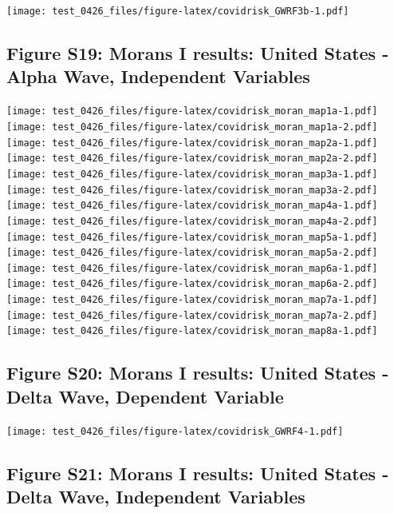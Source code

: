 \documentclass[
]{article}
\begin{document}
\texttt{[image: test\_0426\_files/figure-latex/covidrisk\_GWRF3b-1.pdf]}

\newpage

\hypertarget{figure-s19-morans-i-results-united-states---alpha-wave-independent-variables}{%
\subsection{Figure S19: Morans I results: United States - Alpha Wave,
Independent
Variables}\label{figure-s19-morans-i-results-united-states---alpha-wave-independent-variables}}

\texttt{[image: test\_0426\_files/figure-latex/covidrisk\_moran\_map1a-1.pdf]}
\texttt{[image: test\_0426\_files/figure-latex/covidrisk\_moran\_map1a-2.pdf]}
\newpage
\texttt{[image: test\_0426\_files/figure-latex/covidrisk\_moran\_map2a-1.pdf]}
\texttt{[image: test\_0426\_files/figure-latex/covidrisk\_moran\_map2a-2.pdf]}
\newpage
\texttt{[image: test\_0426\_files/figure-latex/covidrisk\_moran\_map3a-1.pdf]}
\texttt{[image: test\_0426\_files/figure-latex/covidrisk\_moran\_map3a-2.pdf]}
\newpage
\texttt{[image: test\_0426\_files/figure-latex/covidrisk\_moran\_map4a-1.pdf]}
\texttt{[image: test\_0426\_files/figure-latex/covidrisk\_moran\_map4a-2.pdf]}
\newpage
\texttt{[image: test\_0426\_files/figure-latex/covidrisk\_moran\_map5a-1.pdf]}
\texttt{[image: test\_0426\_files/figure-latex/covidrisk\_moran\_map5a-2.pdf]}
\newpage
\texttt{[image: test\_0426\_files/figure-latex/covidrisk\_moran\_map6a-1.pdf]}
\texttt{[image: test\_0426\_files/figure-latex/covidrisk\_moran\_map6a-2.pdf]}
\newpage
\texttt{[image: test\_0426\_files/figure-latex/covidrisk\_moran\_map7a-1.pdf]}
\texttt{[image: test\_0426\_files/figure-latex/covidrisk\_moran\_map7a-2.pdf]}
\newpage
\texttt{[image: test\_0426\_files/figure-latex/covidrisk\_moran\_map8a-1.pdf]}
\newpage

\hypertarget{figure-s20-morans-i-results-united-states---delta-wave-dependent-variable}{%
\subsection{Figure S20: Morans I results: United States - Delta Wave,
Dependent
Variable}\label{figure-s20-morans-i-results-united-states---delta-wave-dependent-variable}}

\texttt{[image: test\_0426\_files/figure-latex/covidrisk\_GWRF4-1.pdf]}

\hypertarget{figure-s21-morans-i-results-united-states---delta-wave-independent-variables}{%
\subsection{Figure S21: Morans I results: United States - Delta Wave,
Independent
Variables}\label{figure-s21-morans-i-results-united-states---delta-wave-independent-variables}}
\end{document}
